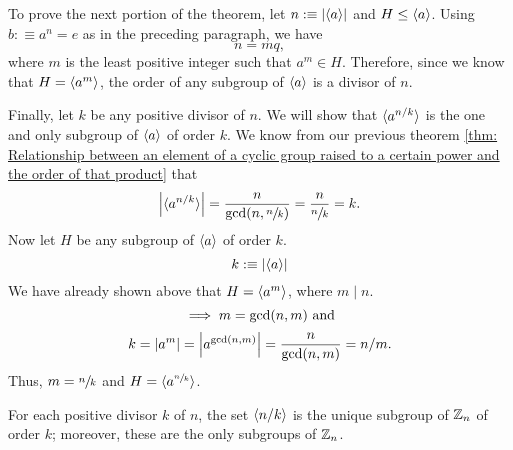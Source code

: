 \begin{prf}
  To prove the next portion of the theorem, let $n :\equiv \abs{\langle a \rangle}$ and $H \leq \langle a \rangle$. Using $b :\equiv a^n = e$ as in the preceding paragraph, we have
  \begin{equation}
    n = mq,
  \end{equation}
  where $m$ is the least positive integer such that $a^m \in H$. Therefore, since we know that $H = \langle a^m \rangle$, the order of any subgroup of $\langle a \rangle$ is a divisor of $n$.

  Finally, let $k$ be any positive divisor of $n$. We will show that $\langle a^{n/k} \rangle$ is the one and only subgroup of $\langle a \rangle$ of order $k$. We know from our previous theorem \ref{thm: Relationship between an element of a cyclic group raised to a certain power and the order of that product} that
  \begin{equation}
    \abs{\langle a^{n/k} \rangle} = \frac{n}{\gcd(n, \sfrac{n}{k})} = \frac{n}{\sfrac{n}{k}} =k.
  \end{equation}
  Now let $H$ be any subgroup of $\langle a \rangle$ of order $k$.
  \begin{equation}
    k :\equiv \abs{\langle a \rangle}
  \end{equation}
  We have already shown above that $H = \langle a^m \rangle$, where $m \mid n$.
  \begin{equation}
    \implies m=\gcd(n,m) $ and$
  \end{equation}
  \begin{equation}
    k = \abs{a^m} = \abs{a^{\gcd(n,m)}}=\frac{n}{\gcd(n,m)} = n/m.
  \end{equation}
Thus, $m = \sfrac{n}{k} $ and $ H = \langle a^{\sfrac{n}{k}} \rangle$.
\end{prf}

\begin{corollary} 
  For each positive divisor $k$ of $n$, the set $\langle n/k \rangle$ is the unique subgroup of $\mathbb{Z}_n$ of order $k$; moreover, these are the only subgroups of $\mathbb{Z}_n$.
\end{corollary}